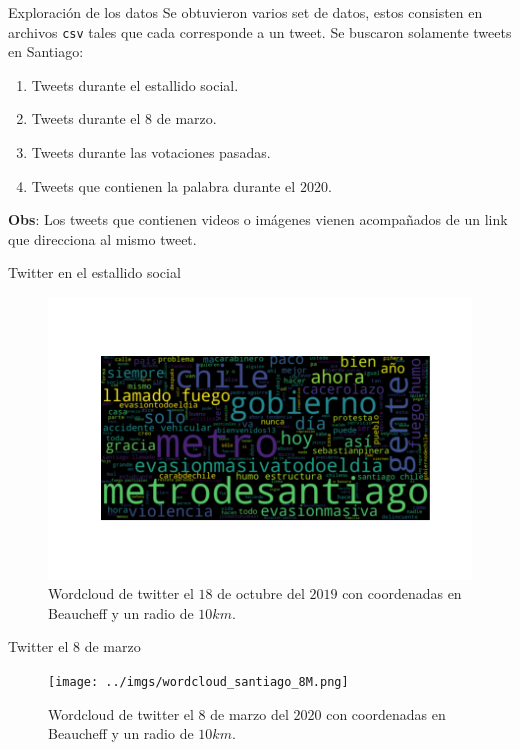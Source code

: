 \documentclass{beamer}
\begin{document}
	\begin{frame}{Exploración de los datos}
		Se obtuvieron varios set de datos, estos consisten en archivos \texttt{csv} tales que cada  corresponde a un tweet. Se buscaron solamente tweets en Santiago:
		\begin{enumerate}
			\item Tweets durante el estallido social.
			\item Tweets durante el $8$ de marzo.
			\item Tweets durante las votaciones pasadas.
			\item Tweets que contienen la palabra  durante el $2020$.
		\end{enumerate}
		\vspace{.5cm}
		\textbf{Obs}: Los tweets que contienen videos o imágenes vienen acompañados de un link que direcciona al mismo tweet. 
	\end{frame}


	

	\begin{frame}{Twitter en el estallido social}
		\begin{figure}[h]
			\centering
			\includegraphics[scale=.5]{../imgs/wordcloud_santiago_estallido1.png}
			\caption{Wordcloud de twitter el $18$ de octubre del $2019$ con coordenadas en Beaucheff y un radio de $10km$.}
		\end{figure}
	\end{frame}

	\begin{frame}{Twitter el $8$ de marzo}
		\begin{figure}[h]
			\centering
			\texttt{[image: ../imgs/wordcloud\_santiago\_8M.png]}
			\caption{Wordcloud de twitter el $8$ de marzo del $2020$ con coordenadas en Beaucheff y un radio de $10km$.}
		\end{figure}
	\end{frame}
\end{document}
